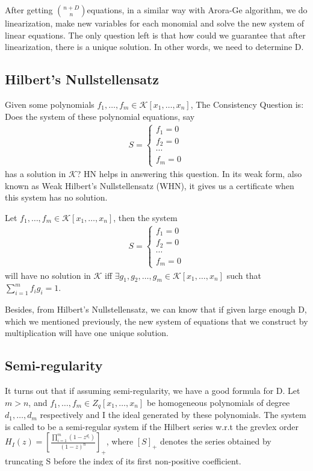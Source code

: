 \documentclass[a4paper]{article}
\theoremstyle{definition}
\theoremstyle{remark}
\begin{document}
After getting  ${n + D}\choose {n}$equations, in a similar way with Arora-Ge algorithm, we do linearization, make new variables for each monomial and solve the new system of linear equations. The only question left is that how could we guarantee that after linearization, there is a unique solution. In other words, we need to determine D.
\subsection{Hilbert’s Nullstellensatz}
Given some polynomials $f _ { 1 } , \dots , f _ { m } \in \mathcal { K } \left[ x _ { 1 } , \dots , x _ { n } \right]$, The Consistency Question is: Does the system of these polynomial equations, say
\begin{gather*}
S = \left\{ \begin{array} { l } { f _ { 1 } = 0 } \\ { f _ { 2 } = 0 } \\ { \cdots } \\ { f _ { m } = 0 } \end{array} \right.
\end{gather*}
has a solution in $\mathcal{K}$? HN helps in answering this question. In its weak form, also known as Weak Hilbert’s Nullstellensatz (WHN), it gives us a certificate when this system has no solution.
\begin{theorem}
Let $f _ { 1 } , \dots , f _ { m } \in \mathcal { K } \left[ x _ { 1 } , \dots , x _ { n } \right]$,
then the system
\begin{gather*}
S = \left\{ \begin{array} { l } { f _ { 1 } = 0 } \\ { f _ { 2 } = 0 } \\ { \cdots } \\ { f _ { m } = 0 } \end{array} \right.
\end{gather*}
will have no solution in $\mathcal{K}$ iff $\exists g _ { 1 } , g _ { 2 } , \ldots , g _ { m }$$ \in \mathcal { K } \left[ x _ { 1 } , \ldots , x _ { n } \right]$ such that $\sum _ { i = 1 } ^ { m } f _ { i } g _ { i } = 1$.
\end{theorem}
Besides, from Hilbert’s Nullstellensatz, we can know that if given large enough D, which we mentioned previously, the new system of equations that we construct by multiplication will have one unique solution.
\subsection{Semi-regularity}
It turns out that if assuming semi-regularity, we have a good formula for D.
Let $m > n$, and $f _ { 1 } , \ldots , f _ { m } \in Z _ { q } \left[ x _ { 1 } , \dots , x _ { n } \right]$ be homogeneous polynomials of degree $d _ { 1 } , \dots , d _ { m }$ respectively and I the ideal
generated by these polynomials. The system is called to be a semi-regular system if the Hilbert series w.r.t the grevlex order
$H _ { I } ( z ) = \left[ \frac { \prod _ { i = 1 } ^ { m } \left( 1 - z ^ { d _ { i } } \right) } { ( 1 - z ) ^ { n } } \right] _ { + }$, where $[S]_{+}$ denotes the series obtained by truncating S before the index of its first non-positive coefficient.
\end{document}
